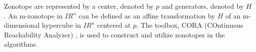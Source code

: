 Zonotope are represented by a center, denoted by $p$ and generators, denoted by $H$. An m-zonotope in ${I\!R}^n$ can be defined as an affine transformation by $H$ of an m-dimensional hypercube in ${I\!R}^n$ centered at $p$. The toolbox, CORA (COntinuous Reachability Analyzer) \cite{Althoff2018}, is used to construct and utilize zonotopes in the algorithms.

